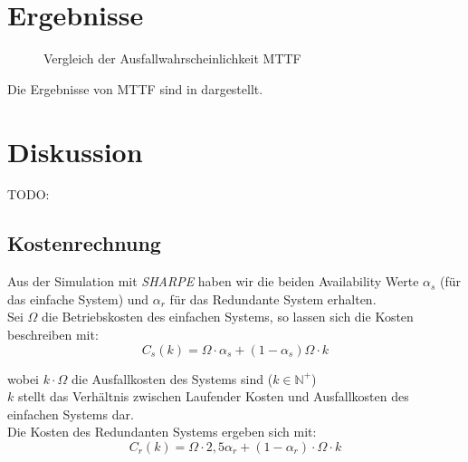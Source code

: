 \documentclass[
            a4paper
            ]{scrartcl}%
\begin{document}
\section{Ergebnisse}
\begin{figure}
\centering
{}
\caption{Vergleich der Ausfallwahrscheinlichkeit MTTF}
\label{fig:mttf_result}
\end{figure}
Die Ergebnisse von MTTF sind in  dargestellt.

\section{Diskussion}
TODO:
\subsection{Kostenrechnung}
Aus der Simulation mit \emph{SHARPE} haben wir die beiden Availability Werte $\alpha_s$ (für das einfache System) und $\alpha_r$ für das Redundante System erhalten.\\
Sei $\Omega$ die Betriebskosten des einfachen Systems, so lassen sich die Kosten beschreiben mit:
\begin{equation}
C_s(k) = \Omega \cdot \alpha_s + (1-\alpha_s)\Omega \cdot k
\end{equation}

wobei $k \cdot \Omega$ die Ausfallkosten des Systems sind ($k \in \mathbb{N}^+$)\\$k$ stellt das Verhältnis zwischen Laufender Kosten und Ausfallkosten des einfachen Systems dar.\\
Die Kosten des Redundanten Systems ergeben sich mit: 
\begin{equation}
C_r(k) = \Omega \cdot 2,5 \alpha_r + (1- \alpha_r) \cdot \Omega \cdot k
\end{equation}
\end{document}
